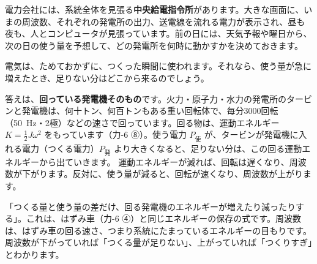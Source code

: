 \begin{phmijika}[中央給電指令所]
電力会社には、系統全体を見張る\textbf{中央給電指令所}があります。大きな画面に、いまの周波数、それぞれの発電所の出力、送電線を流れる電力が表示され、昼も夜も、人とコンピュータが見張っています。前の日には、天気予報や曜日から、次の日の使う量を予想して、どの発電所を何時に動かすかを決めておきます。
\end{phmijika}

\leavevmode\label{ph:電-16:sec2}電気は、ためておかずに、つくった瞬間に使われます。それなら、使う量が急に増えたとき、足りない分はどこから来るのでしょう。

答えは、\textbf{回っている発電機そのもの}です。火力・原子力・水力の発電所のタービンと発電機は、何十トン、何百トンもある重い回転体で、毎分3000回転（\qty{50}{Hz}・2極）などの速さで回っています。回る物は、運動エネルギー $K=\tfrac12J\omega^2$ をもっています（力-6 ⑧）。使う電力 $P_{\text{使}}$ が、タービンが発電機に入れる電力（つくる電力）$P_{\text{発}}$ より大きくなると、足りない分は、この回る運動エネルギーから出ていきます。
\label{ph:電-16:swing}運動エネルギーが減れば、回転は遅くなり、周波数が下がります。反対に、使う量が減ると、回転が速くなり、周波数が上がります。

\begin{phyomi}[$\dfrac{\dd K}{\dd t}=P_{\text{発}}-P_{\text{使}}$]
「つくる量と使う量の差だけ、回る発電機のエネルギーが増えたり減ったりする」。これは、はずみ車（力-6 ④）と同じエネルギーの保存の式です。周波数は、はずみ車の回る速さ、つまり系統にたまっているエネルギーの目もりです。周波数が下がっていれば「つくる量が足りない」、上がっていれば「つくりすぎ」とわかります。
\end{phyomi}

